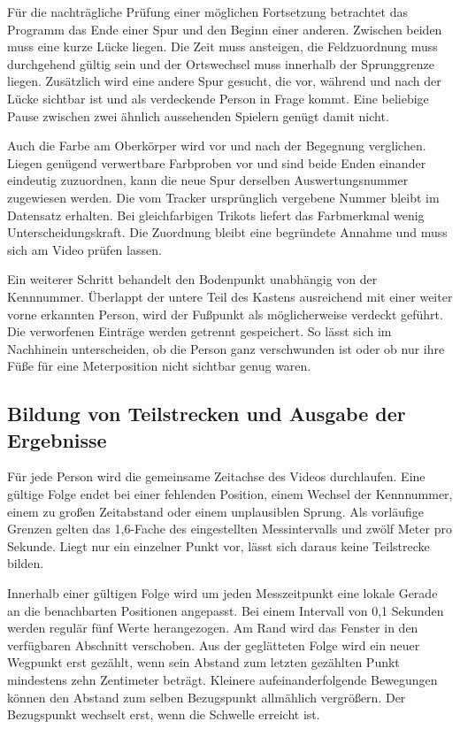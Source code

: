 Für die nachträgliche Prüfung einer möglichen Fortsetzung betrachtet das Programm das Ende einer Spur und den Beginn einer anderen. Zwischen beiden muss eine kurze Lücke liegen. Die Zeit muss ansteigen, die Feldzuordnung muss durchgehend gültig sein und der Ortswechsel muss innerhalb der Sprunggrenze liegen. Zusätzlich wird eine andere Spur gesucht, die vor, während und nach der Lücke sichtbar ist und als verdeckende Person in Frage kommt. Eine beliebige Pause zwischen zwei ähnlich aussehenden Spielern genügt damit nicht.

Auch die Farbe am Oberkörper wird vor und nach der Begegnung verglichen. Liegen genügend verwertbare Farbproben vor und sind beide Enden einander eindeutig zuzuordnen, kann die neue Spur derselben Auswertungsnummer zugewiesen werden. Die vom Tracker ursprünglich vergebene Nummer bleibt im Datensatz erhalten. Bei gleichfarbigen Trikots liefert das Farbmerkmal wenig Unterscheidungskraft. Die Zuordnung bleibt eine begründete Annahme und muss sich am Video prüfen lassen.

Ein weiterer Schritt behandelt den Bodenpunkt unabhängig von der Kennnummer. Überlappt der untere Teil des Kastens ausreichend mit einer weiter vorne erkannten Person, wird der Fußpunkt als möglicherweise verdeckt geführt. Die verworfenen Einträge werden getrennt gespeichert. So lässt sich im Nachhinein unterscheiden, ob die Person ganz verschwunden ist oder ob nur ihre Füße für eine Meterposition nicht sichtbar genug waren.

\subsection{Bildung von Teilstrecken und Ausgabe der Ergebnisse}
Für jede Person wird die gemeinsame Zeitachse des Videos durchlaufen. Eine gültige Folge endet bei einer fehlenden Position, einem Wechsel der Kennnummer, einem zu großen Zeitabstand oder einem unplausiblen Sprung. Als vorläufige Grenzen gelten das 1,6-Fache des eingestellten Messintervalls und zwölf Meter pro Sekunde. Liegt nur ein einzelner Punkt vor, lässt sich daraus keine Teilstrecke bilden.

Innerhalb einer gültigen Folge wird um jeden Messzeitpunkt eine lokale Gerade an die benachbarten Positionen angepasst. Bei einem Intervall von 0,1 Sekunden werden regulär fünf Werte herangezogen. Am Rand wird das Fenster in den verfügbaren Abschnitt verschoben. Aus der geglätteten Folge wird ein neuer Wegpunkt erst gezählt, wenn sein Abstand zum letzten gezählten Punkt mindestens zehn Zentimeter beträgt. Kleinere aufeinanderfolgende Bewegungen können den Abstand zum selben Bezugspunkt allmählich vergrößern. Der Bezugspunkt wechselt erst, wenn die Schwelle erreicht ist.

